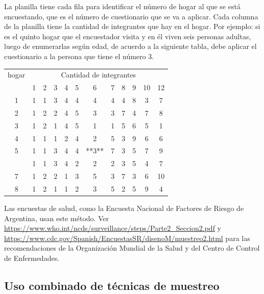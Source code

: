 \documentclass[]{book}
\begin{document}
La planilla tiene cada fila para identificar el número de hogar al que se está encuestando, que es el número de cuestionario que se va a aplicar. Cada columna de la planilla tiene la cantidad de integrantes que hay en el hogar. Por ejemplo: si es el quinto hogar que el encuestador visita y en él viven seis personas adultas, luego de enumerarlas según edad, de acuerdo a la siguiente tabla, debe aplicar el cuestionario a la persona que tiene el número 3.

\begin{table}[H]
\centering
\begin{tabular}{cccccccccccc}
\toprule
\multicolumn{1}{c}{hogar} & \multicolumn{11}{c}{Cantidad de integrantes} \\
\cmidrule(l{3pt}r{3pt}){1-1} \cmidrule(l{3pt}r{3pt}){2-12}
 & 1 & 2 & 3 & 4 & 5 & 6 & 7 & 8 & 9 & 10 & 12\\
\midrule
\rowcolor{gray!6}  1 & 1 & 1 & 3 & 4 & 4 & 4 & 4 & 4 & 8 & 3 & 7\\
2 & 1 & 2 & 2 & 4 & 5 & 3 & 3 & 7 & 4 & 7 & 8\\
\rowcolor{gray!6}  3 & 1 & 2 & 1 & 4 & 5 & 1 & 1 & 5 & 6 & 5 & 1\\
4 & 1 & 1 & 1 & 2 & 4 & 2 & 5 & 3 & 9 & 6 & 6\\
\rowcolor{gray!6}  5 & 1 & 1 & 3 & 4 & 4 & **3** & 7 & 3 & 5 & 7 & 9\\
\addlinespace
6 & 1 & 1 & 3 & 4 & 2 & 2 & 2 & 3 & 5 & 4 & 7\\
\rowcolor{gray!6}  7 & 1 & 2 & 2 & 1 & 3 & 5 & 3 & 7 & 3 & 6 & 10\\
8 & 1 & 2 & 1 & 1 & 2 & 3 & 5 & 2 & 5 & 9 & 4\\
\bottomrule
\end{tabular}
\end{table}

Las encuestas de salud, como la Encuesta Nacional de Factores de Riesgo de Argentina, usan este método. Ver \url{https://www.who.int/ncds/surveillance/steps/Parte2_Seccion2.pdf} y \url{https://www.cdc.gov/Spanish/EncuestasSR/disenoM/muestreo2.html} para las recomendaciones de la Organización Mundial de la Salud y del Centro de Control de Enfermedades.

\hypertarget{uso-combinado-de-tuxe9cnicas-de-muestreo}{%
\subsection{Uso combinado de técnicas de muestreo}\label{uso-combinado-de-tuxe9cnicas-de-muestreo}}
\end{document}
